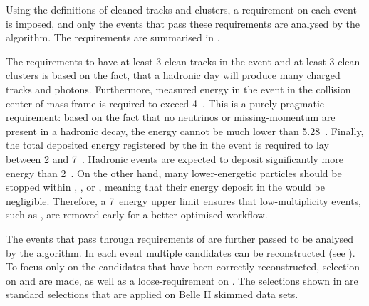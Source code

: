 Using the definitions of cleaned tracks and \ECL clusters, a requirement on each event is imposed, and only the events that pass these requirements are analysed by the \FEI algorithm.
The requirements are summarised in .

\begin{table}[htbp!]
    \centering
     \caption{\label{tab:fei_precuts} Selections before running the \FEI algorithm.
     Cleaned tracks and clusters are defined in .
     }
\end{table}
The requirements to have at least 3 clean tracks in the event and at least 3 clean \ECL clusters is based on the fact, that a hadronic day will produce many charged tracks and photons.
Furthermore, measured energy in the event in the \epem collision center-of-mass frame is required to exceed 4~\gev.
This is a purely pragmatic requirement: based on the fact that no neutrinos or missing-momentum are present in a hadronic decay, the energy cannot be much lower than 5.28~\gev.
Finally, the total deposited energy registered by the \ECL in the event is required to lay between 2 and 7~\gev.
Hadronic events are expected to deposit significantly more energy than 2~\gev.
On the other hand, many lower-energetic particles should be stopped within \PXD, \SVD, \CDC or \TOP, meaning that their energy deposit in the \ECL would be negligible.
Therefore, a 7~\gev \ECL energy upper limit ensures that low-multiplicity events, such as \epem\ra\epem, are removed early for a better optimised workflow.

The events that pass through requirements of  are further passed to be analysed by the \FEI algorithm.
In each event multiple \FEI candidates can be reconstructed (see ).
To focus only on the candidates that have been correctly reconstructed, selection on \DeltaE and \Mbc are made, as well as a loose-requirement on \feiProb.
The selections shown in  are standard selections that are applied on Belle II \FEI skimmed data sets.

